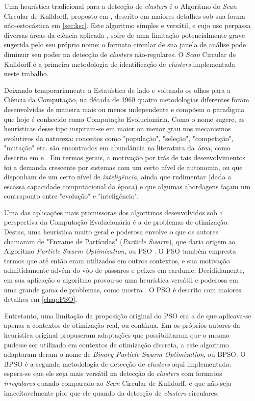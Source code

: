 \documentclass[
	12pt,				%
	openright,			%
	twoside,			%
	a4paper,			%
	english,			%
	french,				%
	spanish,			%
	brazil				%
	]{abntex2}
\begin{document}
Uma heurística tradicional para a detecção de \textit{clusters} é o Algoritmo do \textit{Scan} Circular de Kulldorff, proposto em \cite{kulldorff1997spatial}, descrito em maiores detalhes sob sua forma não-estocástica em \ref{sec:ksc}. Este algoritmo simples e versátil, e cujo uso perpassa diversas áreas da ciência aplicada \cite{kulldorff1999spatial}, sofre de uma limitação potencialmente grave sugerida pelo seu próprio nome: o formato circular de sua janela de análise pode diminuir seu poder na detecção de \textit{clusters} não-regulares. O \textit{Scan} Circular de Kulldorff é a primeira metodologia de identificação de \textit{clusters} implementada neste trabalho.

Deixando temporariamente a Estatística de lado e voltando os olhos para a Ciência da Computação, na década de 1960 quatro metodologias diferentes foram desenvolvidas de maneira mais ou menos independente e compõem o paradigma que hoje é conhecido como Computação Evolucionária. Como o nome sugere, as heurísticas desse tipo inspiram-se em maior ou menor grau nos mecanismos evolutivos da natureza: conceitos como "população", "seleção", "competição", "mutação" etc. são encontrados em abundância na literatura da área, como descrito em \cite{fogel1994introduction} e \cite{back1997evolutionary}. Em termos gerais, a motivação por trás de tais desenvolvimentos foi a demanda crescente por sistemas com um certo nível de autonomia, ou que disponham de um certo nível de \textit{inteligência}, ainda que rudimentar (dada a escassa capacidade computacional da época) e que algumas abordagens façam um contraponto entre "evolução" e "inteligência". 

Uma das aplicações mais promissoras dos algoritmos desenvolvidos sob a perspectiva da Computação Evolucionária é a de problemas de otimização. Destas, uma heurística muito geral e poderosa envolve o que os autores chamaram de "Enxame de Partículas" (\textit{Particle Swarm}), que daria origem ao Algoritmo \textit{Particle Swarm Optimization}, ou PSO \cite{eberhart1995new}. O PSO também empresta termos que até então eram utilizados em outros contextos, e sua motivação admitidamente advém do vôo de pássaros e peixes em cardume. Decididamente, em sua aplicação o algoritmo provou-se uma heurística versátil e poderosa em uma grande gama de problemas, como mostra \cite{shi2001particle}. O PSO é descrito com maiores detalhes em \ref{chap:PSO}.

Entretanto, uma limitação da proposição original do PSO era a de que aplicava-se apenas a contextos de otimização real, ou contínua. Em \cite{kennedy1997discrete} os próprios autores da heurística original propuseram adaptações que possibilitaram que o mesmo pudesse ser utilizado em contextos de otimização discreta, a este algoritmo adaptaram deram o nome de \textit{Binary Particle Swarm Optimization}, ou BPSO. O BPSO é a segunda metodologia de detecção de \textit{clusters} aqui implementada: espera-se que ele seja mais versátil na detecção de \textit{clusters} com formatos \textit{irregulares} quando comparado ao \textit{Scan} Circular de Kulldorff, e que não seja inaceitavelmente pior que ele quando da detecção de \textit{clusters} circulares.
\end{document}
